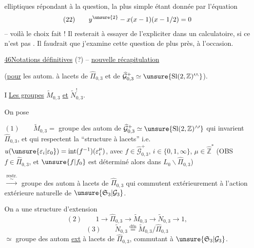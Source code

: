 
elliptiques répondant à la question, la plus simple étant donnée par l'équation
\[
(22)\qquad y^{\unsure{2}}-x(x-1)(x-1/2)=0
\]
--  voilà le choix fait ! Il resterait à essayer de l'expliciter  dans un  calculatoire, si ce n'est pas . Il faudrait que j'examine cette  question de plus près, à l'occasion.


\uline{46}\quad \uline{Notations définitives} (?) -- \uline{nouvelle récapitulation}

(\uline{pour} les autom. à lacets de $\widehat{\Pi}_{0,3}$ et de $\widehat{\mathcal G}_{0,3}^{+}\simeq\unsure{\mathrm{Sl}(2,\mathbb Z)^{\prime\wedge}}$).

\textcircled{I}\quad \uline{Les groupes} $\widetilde M_{0,3}$ \uline{et} $\widetilde N_{0,3}^{!}$.

On pose

$(1)\qquad\widetilde M_{0,3}=$ groupe des autom de $\widehat{\mathcal G}_{0,3}^{+}\simeq\unsure{\mathrm{Sl}(2,\mathbb Z)^{\wedge\prime}}$ qui invarient $\widehat{\Pi}_{0,3}$, et qui respectent la ``structure à lacets'' i.e.  $u(\unsure{\varepsilon_i|\varepsilon_0})=\operatorname{int}(f^{-1})(\varepsilon_i^\mu)$, avec $f\in\widehat{\mathcal G}_{0,3}^{+}$, $i\in\{0,1,\infty\}$, $\mu\in\widehat{\mathbb Z}^{*}$ (OBS $f\in\widehat{\Pi}_{0,3}$, et $\unsure{f|f_0}$ est déterminé alors dans $L_0\backslash\widehat{\Pi}_{0,3}$)

$\overset{\mathrm{restr.}}{\overset{\sim}{\longrightarrow}}$ groupe des autom  à lacets de $\widehat{\Pi}_{0,3}$ qui commutent extérieurement à l'action extérieure naturelle de $\unsure{\mathfrak S_3|\mathcal G_3}$.


On a une structure d'extension
\[
(2)\qquad 1\longrightarrow\widehat{\Pi}_{0,3}\longrightarrow\widetilde M_{0,3}\longrightarrow\widetilde N_{0,3}\longrightarrow1,
\]
 
\[
(3)\qquad\widetilde N_{0,3}\overset{\mathrm{dfn}}{=}\widetilde M_{0,3}/\widehat{\Pi}_{0,3}
\]
$\simeq$ groupe des autom \uline{ext} à lacets de $\widehat{\Pi}_{0,3}$, commutant à $\unsure{\mathfrak S_3|\mathcal G_3}$.


